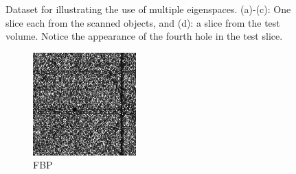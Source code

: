 \documentclass[journal]{IEEEtran}
\begin{document}
\begin{figure}[!h]
\begin{subfigure}[b]{0.235\linewidth}
        \caption{}
\label{fig:potato_test}
     \end{subfigure}
      \caption{Dataset for illustrating the use of multiple eigenspaces. (a)-(c): One slice each from the scanned objects, and (d): a slice from the test volume. Notice the appearance of the fourth hole in the test slice. }
\label{fig:potato_data_2D}
\end{figure}

\begin{figure}[!h]
    \begin{subfigure}[b]{0.24\linewidth}
        \includegraphics[width=\textwidth]{../images/potato/post_tci/comparison/weightsIm_fbp30.png}
        \caption{FBP}
    \end{subfigure}
    \begin{subfigure}[b]{0.24\linewidth}

\end{subfigure}
\end{figure}
\end{document}
